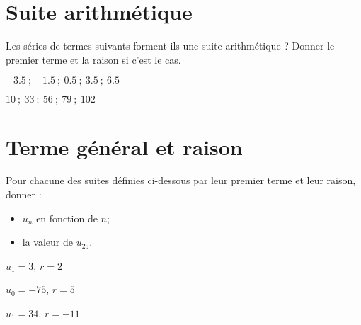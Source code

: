 	\section{Suite arithmétique}
Les séries de termes suivants forment-ils une suite arithmétique ? Donner le premier terme et la raison si c'est le cas.
\begin{questions}
	
	
	\question[2] $\num{-3.5} \: ; \: \num{-1.5} \: ; \: \num{0.5}  \: ; \:  \num{3.5} \: ; \: \num{6.5}$ 
	\fillwithdottedlines{3.5cm}
	
	\question[2] $\num{10} \: ; \:  \num{33} \: ; \: \num{56} \: ; \: \num{79} \: ; \: \num{102}$ 
	\fillwithdottedlines{3.5cm}
	
\end{questions}


\section{Terme général et raison}

Pour chacune des suites définies ci-dessous par leur premier terme et leur raison, donner :
\begin{itemize}
	\item $u_n$ en fonction de $n$;
	\item la valeur de $u_{25}$.
\end{itemize} 
\begin{questions}
	
	
	\question[2] $u_1 = 3$, $r= 2$
	
	\fillwithdottedlines{6cm}
	
	\question[2] $u_0 = -75$, $r= 5$
	
	\fillwithdottedlines{6cm}
	
	\question[2] $u_1 = 34$, $r=-11$
	
	\fillwithdottedlines{6cm}
\end{questions}

